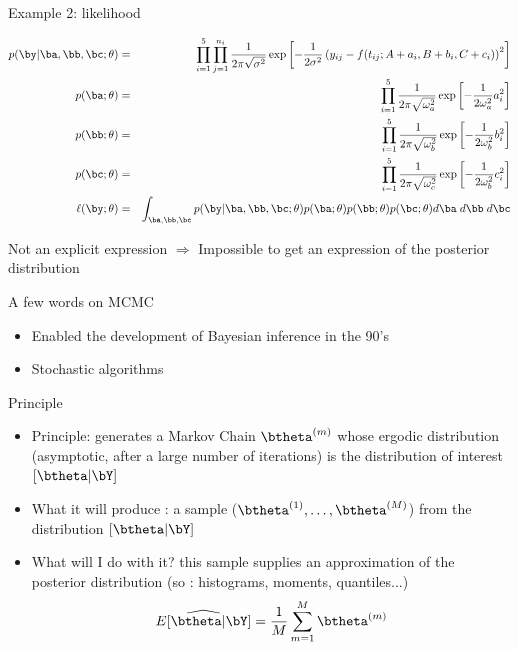  \begin{frame}{Example 2: likelihood}

{\small 
\begin{eqnarray*}
 p(\by | \ba,\bb,\bc;\theta) &=& \prod_{i=1}^5 \prod_{j=1}^{n_{i}} \frac{1}{2\pi \sqrt{\sigma^2}} \exp\left[-\frac{1}{2\sigma^2}\left(y_{ij}- f(t_{ij};A+a_i,B+b_i,C+c_i)\right)^2\right]\\
 p(\ba;\theta)  &=& \prod_{i=1}^5 \frac{1}{2\pi \sqrt{\omega_a^2}}  \exp\left[-\frac{1}{2\omega_a^2} a_i^2\right]\\
 p(\bb;\theta)  &=& \prod_{i=1}^5 \frac{1}{2\pi \sqrt{\omega_b^2}}  \exp\left[-\frac{1}{2\omega_b^2} b_i ^2\right]\\
 p(\bc;\theta)  &=& \prod_{i=1}^5 \frac{1}{2\pi \sqrt{\omega_c^2}}  \exp\left[-\frac{1}{2\omega_b^2} c_i^2\right]\\
  \ell(\by;\theta) &=& \int_{\ba,\bb,\bc} p(\by|\ba,\bb,\bc;\theta)p(\ba;\theta) p(\bb;\theta) p(\bc;\theta) d\ba\;  d\bb \;  d\bc 
\end{eqnarray*}}

\centering Not an explicit expression \color{dgreen} $\Rightarrow$ \color{black} Impossible to get an expression of the posterior distribution
 
 \end{frame}


\begin{frame}{A few words on MCMC}
 
\begin{itemize}
 \item Enabled the development of Bayesian inference in the  90's
 \item Stochastic algorithms
\end{itemize}

\begin{block}{Principle}
 \begin{itemize}
 \item  \vert Principle: \noir generates a Markov Chain  $\btheta^{(m)}$ whose ergodic distribution  (asymptotic, after a large number of iterations) is the distribution of interest  $[\btheta |\bY]$
 \item \vert What it will produce : \noir a sample  ($\btheta^{(1)} ,\dots, \btheta^{(M)}$) from the distribution $[\btheta | \bY]$
 \item \vert What will I do with it?  \noir  this sample supplies an approximation of the posterior distribution  (so : histograms, moments, quantiles...) 
 $$ \widehat{E[\btheta | \bY]} = \frac{1}{M}\sum_{m=1}^M \btheta^{(m)}$$
\end{itemize}

\end{block}


\end{frame}
 

